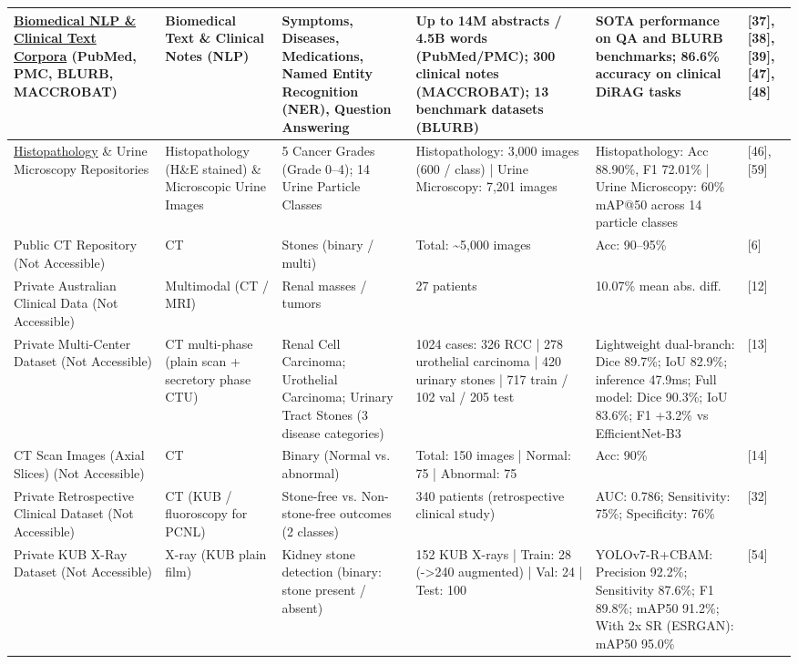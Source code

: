 \documentclass{article}
\begin{document}
\begin{longtable}{|L{3.0cm}|L{1.8cm}|L{2.5cm}|L{3.2cm}|L{4.2cm}|L{1.8cm}|}
\hline
\href{https://huggingface.co/datasets/ncbi/pubmed}{Biomedical NLP \& Clinical Text Corpora} (PubMed, PMC, BLURB, MACCROBAT) & Biomedical Text \& Clinical Notes (NLP) & Symptoms, Diseases, Medications, Named Entity Recognition (NER), Question Answering & Up to 14M abstracts / 4.5B words (PubMed/PMC); 300 clinical notes (MACCROBAT); 13 benchmark datasets (BLURB) & SOTA performance on QA and BLURB benchmarks; 86.6\% accuracy on clinical DiRAG tasks & [37], [38], [39], [47], [48] \\
\hline
\href{https://drive.google.com/drive/folders/1BQZGKHKOUji9rDA5IVltlLnXLk7_Elic}{Histopathology} \& Urine Microscopy Repositories & Histopathology (H\&E stained) \& Microscopic Urine Images & 5 Cancer Grades (Grade 0–4); 14 Urine Particle Classes & Histopathology: 3,000 images (600 / class) | Urine Microscopy: 7,201 images & Histopathology: Acc 88.90\%, F1 72.01\% | Urine Microscopy: 60\% mAP@50 across 14 particle classes & [46], [59] \\
\hline
Public CT Repository (Not Accessible) & CT & Stones (binary / multi) & Total: \textasciitilde{}5,000 images & Acc: 90–95\% & [6] \\
\hline
Private Australian Clinical Data (Not Accessible) & Multimodal (CT / MRI) & Renal masses / tumors & 27 patients & 10.07\% mean abs. diff. & [12] \\
\hline
Private Multi-Center Dataset (Not Accessible) & CT multi-phase (plain scan + secretory phase CTU) & Renal Cell Carcinoma; Urothelial Carcinoma; Urinary Tract Stones (3 disease categories) & 1024 cases: 326 RCC | 278 urothelial carcinoma | 420 urinary stones | 717 train / 102 val / 205 test & Lightweight dual-branch: Dice 89.7\%; IoU 82.9\%; inference 47.9ms; Full model: Dice 90.3\%; IoU 83.6\%; F1 +3.2\% vs EfficientNet-B3 & [13] \\
\hline
CT Scan Images (Axial Slices) (Not Accessible) & CT & Binary (Normal vs. abnormal) & Total: 150 images | Normal: 75 | Abnormal: 75 & Acc: 90\% & [14] \\
\hline
Private Retrospective Clinical Dataset (Not Accessible) & CT (KUB / fluoroscopy for PCNL) & Stone-free vs. Non-stone-free outcomes (2 classes) & 340 patients (retrospective clinical study) & AUC: 0.786; Sensitivity: 75\%; Specificity: 76\% & [32] \\
\hline
Private KUB X-Ray Dataset (Not Accessible) & X-ray (KUB plain film) & Kidney stone detection (binary: stone present / absent) & 152 KUB X-rays | Train: 28 (->240 augmented) | Val: 24 | Test: 100 & YOLOv7-R+CBAM: Precision 92.2\%; Sensitivity 87.6\%; F1 89.8\%; mAP50 91.2\%; With 2x SR (ESRGAN): mAP50 95.0\% & [54] \\

\end{longtable}
\end{document}
